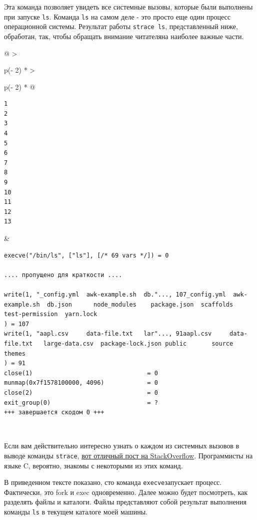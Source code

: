 \documentclass{report}
\begin{document}
Эта команда позволяет увидеть все системные вызовы, которые были
выполнены при запуске \texttt{ls}. Команда \texttt{ls} на самом деле -
это просто еще один процесс операционной системы. Результат работы
\texttt{strace\ ls}, представленный ниже, обработан, так, чтобы обращать
внимание читателяна наиболее важные части.

\begin{longtable}[]{@{}
  >{\raggedright\arraybackslash}p{(\columnwidth - 2\tabcolsep) * }
  >{\raggedright\arraybackslash}p{(\columnwidth - 2\tabcolsep) * }@{}}
\toprule
\endhead
\begin{minipage}[t]{\linewidth}\raggedright
\begin{verbatim}
1
2
3
4
5
6
7
8
9
10
11
12
13
\end{verbatim}
\end{minipage} & \begin{minipage}[t]{\linewidth}\raggedright
\begin{verbatim}
execve("/bin/ls", ["ls"], [/* 69 vars */]) = 0

.... пропущено для краткости ....

write(1, "_config.yml  awk-example.sh  db."..., 107_config.yml  awk-example.sh  db.json      node_modules    package.json  scaffolds  test-permission  yarn.lock
) = 107
write(1, "aapl.csv     data-file.txt   lar"..., 91aapl.csv     data-file.txt   large-data.csv  package-lock.json public       source    themes
) = 91
close(1)                                = 0
munmap(0x7f1578100000, 4096)            = 0
close(2)                                = 0
exit_group(0)                           = ?
+++ завершается скодом 0 +++
\end{verbatim}
\end{minipage} \\ \addlinespace
\bottomrule
\end{longtable}

Если вам действительно интересно узнать о каждом из системных вызовов в
выводе команды \texttt{strace},
\href{https://stackoverflow.com/a/6334557}{вот отличный пост на
StackOverflow}. Программисты на языке C, вероятно, знакомы с некоторыми
из этих команд.

В приведенном тексте показано, сто команда \texttt{execve}запускает
процесс. Фактически, это fork и exec одновременно. Далее можно будет
посмотреть, как разделять файлы и каталоги. Файлы представляют собой
результат выполнения команды \texttt{ls} в текущем каталоге моей машины.
\end{document}
